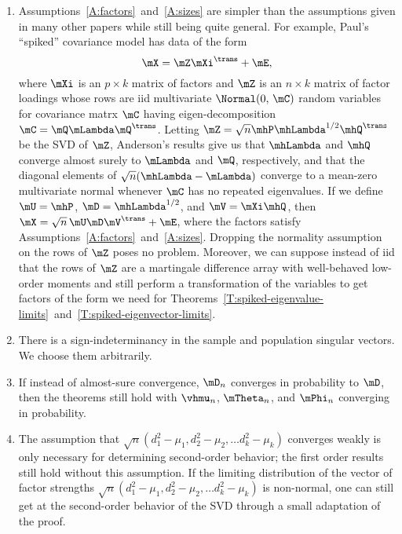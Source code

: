 \begin{enumerate}
    
\item
Assumptions~\ref{A:factors}~and~\ref{A:sizes} are simpler than the assumptions given in many other papers while still being quite general.  For example, Paul's ``spiked'' covariance model has data of the form
\[
    \mX = \mZ \mXi^\trans + \mE,
\]
where $\mXi$ is an $p \times k$ matrix of factors and $\mZ$ is an $n\times k$ matrix of factor loadings whose rows are iid multivariate $\Normal(0,\, \mC)$ random variables for covariance matrx $\mC$ having eigen-decomposition $\mC = \mQ \mLambda \mQ^\trans$.  Letting $\mZ = \sqrt{n} \mhP \mhLambda^{1/2} \mhQ^\trans$ be the SVD of $\mZ$, Anderson's results \cite{anderson1963atp} give us that $\mhLambda$ and $\mhQ$ converge almost surely to $\mLambda$ and $\mQ$, respectively, and that the diagonal elements of $\sqrt{n} (\mhLambda - \mLambda)$ converge to a mean-zero multivariate normal whenever $\mC$ has no repeated eigenvalues.  If we define $\mU = \mhP$, $\mD = \mhLambda^{1/2}$, and $\mV = \mXi \mhQ$, then $\mX = \sqrt{n} \, \mU \mD \mV^\trans + \mE$, where the factors satisfy Assumptions~\ref{A:factors}~and~\ref{A:sizes}.  Dropping the normality assumption on the rows of $\mZ$ poses no problem.  Moreover, we can suppose instead of iid that the rows of $\mZ$ are a martingale difference array with well-behaved low-order moments and still perform a transformation of the variables to get factors of the form we need for Theorems~\ref{T:spiked-eigenvalue-limits}~and~\ref{T:spiked-eigenvector-limits}.

\item
There is a sign-indeterminancy in the sample and population singular vectors. We choose them arbitrarily.

\item
If instead of almost-sure convergence, $\mD_n$ converges in probability to $\mD$,
then the theorems still hold with $\vhmu_n$, $\mTheta_n$, and $\mPhi_n$ converging
in probability.

\item
The assumption that
\(
    \sqrt{n}
    \left(
        d_1^2 - \mu_1,
        d_2^2 - \mu_2,
        \ldots
        d_k^2 - \mu_k
    \right)
\)
converges weakly is only necessary for determining second-order
behavior; the first order results still hold without this assumption.  If
the limiting distribution of the vector of factor strengths
\(
    \sqrt{n}
    \left(
        d_1^2 - \mu_1,
        d_2^2 - \mu_2,
        \ldots
        d_k^2 - \mu_k
    \right)
\)
is non-normal, one can still get at the second-order behavior of the SVD 
through a small adaptation of the proof.


\end{enumerate}
